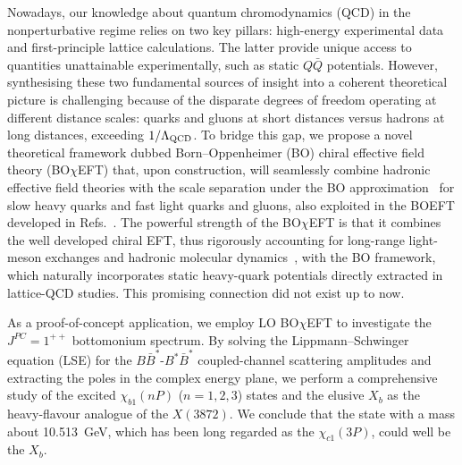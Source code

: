 \documentclass[aps,prl,showpacs,amsmath,twocolumn,superscriptaddress,floatfix,nofootinbib,notitlepage]{revtex4-2}
\newcommand{\X}{X(3872)}
\newcommand{\BOchiEFT}{BO$\chi$EFT\xspace}
\begin{document}
Nowadays, our knowledge about quantum chromodynamics (QCD) in the nonperturbative regime relies on two key pillars: high-energy experimental data and first-principle lattice calculations. The latter provide unique access to quantities unattainable experimentally, such as static $Q\bar Q$ potentials. However, synthesising these two fundamental sources of insight into a coherent theoretical picture is challenging because of the disparate degrees of freedom operating at different distance scales: quarks and gluons at short distances versus hadrons at long distances, exceeding $1/\Lambda_{\rm QCD}$. 
To bridge this gap, we propose a novel theoretical framework dubbed Born--Oppenheimer (BO) chiral effective field theory (\BOchiEFT) that, upon construction, will seamlessly combine hadronic effective field theories with the scale separation under the BO approximation~\cite{Born:1927} for slow heavy quarks and fast light quarks and gluons, also exploited in the BOEFT developed in Refs.~\cite{Braaten:2014qka,Berwein:2015vca,Brambilla:2017uyf,Oncala:2017hop,Soto:2020xpm,Berwein:2024ztx,Brambilla:2026jqz}.
The powerful strength of the \BOchiEFT is that
it combines
the well developed chiral EFT, thus
rigorously accounting for long-range light-meson exchanges and hadronic molecular dynamics~\cite{Baru:2010ww,Hanhart:2011jz,Guo:2016bjq,Hammer:2016prh,Hanhart:2022qxq}, with the BO framework, which naturally incorporates static heavy-quark potentials directly extracted in lattice-QCD studies. This promising connection did not exist up to now. 

As a proof-of-concept application, we employ LO \BOchiEFT to investigate the $J^{PC}=1^{++}$ bottomonium spectrum. By solving the Lippmann--Schwinger equation (LSE) for the $B\bar{B}^*$-$B^*\bar{B}^*$ coupled-channel scattering amplitudes and extracting the poles in the complex energy plane, we perform a comprehensive study of the excited $\chi_{b1}(nP)$ ($n=1,2,3$) states and the elusive $X_b$ as the heavy-flavour analogue of the $\X$.
We conclude that the state with a mass about 10.513~GeV, which has been long regarded as the $\chi_{c1}(3P)$, could well be the $X_b$.
\end{document}
